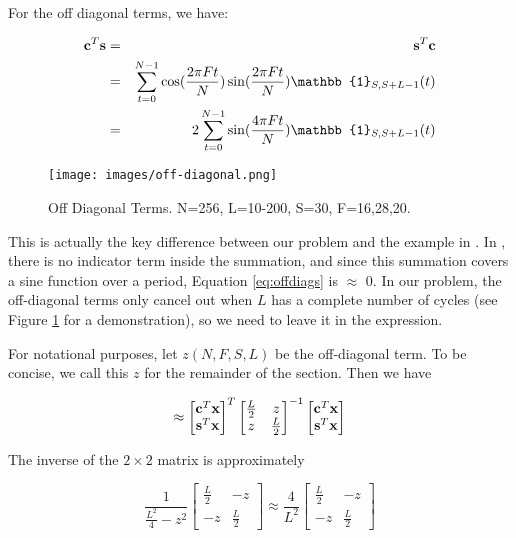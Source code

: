 \documentclass[11pt]{article}
\theoremstyle{plain}
\theoremstyle{definition}
\begin{document}
\noindent For the off diagonal terms, we have:

\begin{eqnarray}
\label{eq:offdiags}
	{\bf c}^T {\bf s} &=& {\bf s}^T {\bf c} \nonumber \\
	&=& \sum_{t=0}^{N-1} \cos(\frac{2 \pi F t}{N}) \sin(\frac{2 \pi F t}{N}) \mathbb{1}_{S,S+L-1}(t) \nonumber \\
	&=& 2 \sum_{t=0}^{N-1} \sin(\frac{4 \pi F t}{N}) \mathbb{1}_{S,S+L-1}(t) \nonumber \\
\end{eqnarray}

\begin{figure}[!ht]
  \centering
  \texttt{[image: images/off-diagonal.png]}
  \caption{Off Diagonal Terms. N=256, L=10-200, S=30, F=16,28,20. }
\label{fig:offdiagonal}
\end{figure}

\noindent This is actually the key difference between our problem and the example in \cite{kay1993fundamentals}. In \cite{kay1993fundamentals}, there is no indicator term inside the summation, and since this summation covers a sine function over a period, Equation \ref{eq:offdiags} is $\approx$ 0. In our problem, the off-diagonal terms only cancel out when $L$ has a complete number of cycles (see Figure \ref{fig:offdiagonal} for a demonstration), so we need to leave it in the expression. 

For notational purposes, let $z(N, F, S, L)$ be the off-diagonal term. To be concise, we call this $z$ for the remainder of the section. Then we have

$$
\approx 
\begin{bmatrix}
{\bf c}^T {\bf x} \\
{\bf s}^T {\bf x} 
\end{bmatrix}^T
\begin{bmatrix}
\frac{L}{2} & z \\ 
z & \frac{L}{2}	
\end{bmatrix}^{-1}
\begin{bmatrix}
{\bf c}^T {\bf x} \\
{\bf s}^T {\bf x} 
\end{bmatrix}
$$

\noindent The inverse of the $2 \times 2$ matrix is approximately

$$
\frac{1}{\frac{L^2}{4} - z^2}
\begin{bmatrix}
\frac{L}{2} & -z \\
-z & \frac{L}{2}
\end{bmatrix}
\approx 
\frac{4}{L^2}
\begin{bmatrix}
\frac{L}{2} & -z \\
-z & \frac{L}{2}
\end{bmatrix}
$$
\end{document}
